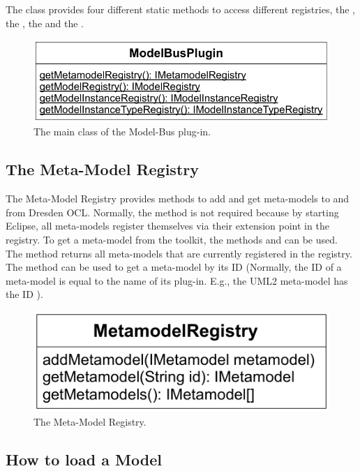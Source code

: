 The class provides four different static methods to access different registries,
the , the , the 
 and the .

\begin{figure}[!b]
	\centering
	\includegraphics[width=.8\linewidth]{figures/integration/modelBusPlugin}
	\caption{The main class of the Model-Bus plug-in.}
	\label{pic:integration:modelBusPlugin}
\end{figure}


\subsection{The Meta-Model Registry}

The Meta-Model Registry provides methods to add and get meta-models to and from 
Dresden OCL. Normally, the method  is not required
because by starting Eclipse, all meta-models register themselves via their 
extension point in the registry. To get a meta-model from the toolkit, the
methods  and  can be used. 
The method  returns all meta-models that are currently 
registered in the registry. The method  can be 
used to get a meta-model by its ID (Normally, the ID of a meta-model is equal to
the name of its plug-in. E.g., the \acs{UML}2 meta-model has the ID 
).

\begin{figure}[!b]
	\centering
	\includegraphics[width=.55\linewidth]{figures/integration/metaModelRegistry}
	\caption{The Meta-Model Registry.}
	\label{pic:integration:metaModelRegistry}
\end{figure}


\subsection{How to load a Model}

